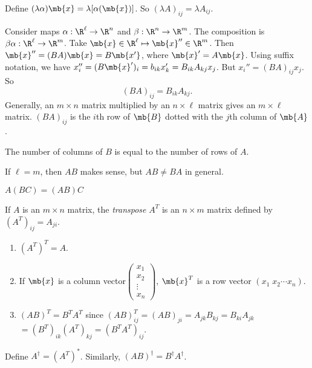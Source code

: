 \documentclass[a4paper]{article}
\begin{document}
\begin{defi}
  Define $(\lambda\alpha)\mb{x} = \lambda[\alpha(\mb{x})]$. So $(\lambda A)_{ij} = \lambda A_{ij}$.
\end{defi}

\begin{defi}
  Consider maps $\alpha: \R^\ell \to \R^n$  and $\beta: \R^n\to \R^m$. The composition is $\beta\alpha:\R^\ell\to\R^m$. Take $\mb{x}\in \R^\ell\mapsto \mb{x}''\in \R^m$. Then $\mb{x}'' = (BA)\mb{x} = B\mb{x'}$, where $\mb{x}' = A\mb{x}$. Using suffix notation, we have $x_i'' = (B\mb{x}')_i = b_{ik}x_k' = B_{ik}A_{kj}x_j$. But $x_i'' = (BA)_{ij}x_j$. So 
  \[
  (BA)_{ij} = B_{ik}A_{kj}.
  \]
  Generally, an $m\times n$ matrix multiplied by an $n\times \ell$ matrix gives an $m\times\ell$ matrix. $(BA)_{ij}$ is the $i$th row of $\mb{B}$ dotted with the $j$th column of $\mb{A}$.
\end{defi}
\note The number of columns of $B$ is equal to the number of rows of $A$.

\note If $\ell = m$, then $AB$ makes sense, but $AB\not= BA$ in general.

\note $A(BC) = (AB)C$

\begin{defi}
  If $A$ is an $m\times n$ matrix, the \emph{transpose} $A^T$ is an $n\times m$ matrix defined by $(A^T)_{ij} = A_{ji}$.
\end{defi}

\begin{prop}\leavevmode
  \begin{enumerate}
  \item $(A^T)^T = A$.
  \item If $\mb{x}$ is a column vector$\begin{pmatrix}x_1\\x_2\\\vdots\\x_n\end{pmatrix}$, $\mb{x}^T$ is a row vector $(x_1\; x_2\cdots x_n)$.
  \item $(AB)^T = B^TA^T$ since $(AB)^T_{ij} = (AB)_{ji} = A_{jk}B_{kj} = B_{ki}A_{jk} $\\$= (B^T)_{ik}(A^T)_{kj} = (B^TA^T)_{ij}$.
  \end{enumerate}
\end{prop}

\begin{defi}
  Define $A^{\dagger} = (A^T)^*$. Similarly, $(AB)^\dagger = B^\dagger A^\dagger$.
\end{defi}
\end{document}
